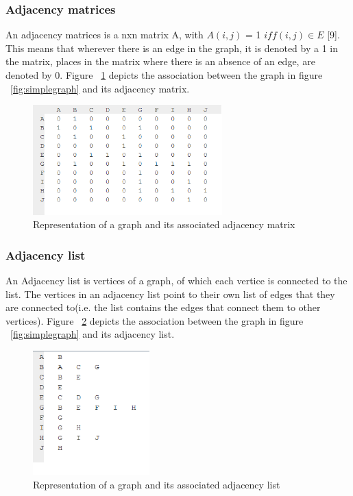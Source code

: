 \subsubsection{Adjacency matrices}
An adjacency matrices is a nxn matrix A, with $A(i,j)$ = 1 $iff(i,j) ∈ E$ [9]. This means that wherever there is an edge in the graph, it is denoted by a 1 in the matrix, places in the matrix where there is an absence of an edge, are denoted by 0.\newline\newline
Figure ~\ref{fig:adjacencymatrix} depicts the association between the graph in figure ~\ref{fig:simplegraph} and its adjacency matrix.
\begin{figure}[H]
  \begin{center}
      \includegraphics[width=0.65\textwidth]{matrix.png}
  \end{center}    
  \caption{Representation of a graph and its associated adjacency matrix}
  \label{fig:adjacencymatrix}
\end{figure}

\subsubsection{Adjacency list}
An Adjacency list is vertices of a graph, of which each vertice is connected to the list. The vertices in an adjacency list point to their own list of edges that they are connected to(i.e. the list contains the edges that connect them to other vertices). \newpage
Figure ~\ref{fig:adjacencylist} depicts the association between the graph in figure ~\ref{fig:simplegraph} and its adjacency list.
\begin{figure}[H]
  \begin{center}
      \includegraphics[width=0.4\textwidth]{list.png}
  \end{center}    
  \caption{Representation of a graph and its associated adjacency list}
  \label{fig:adjacencylist}
\end{figure}

